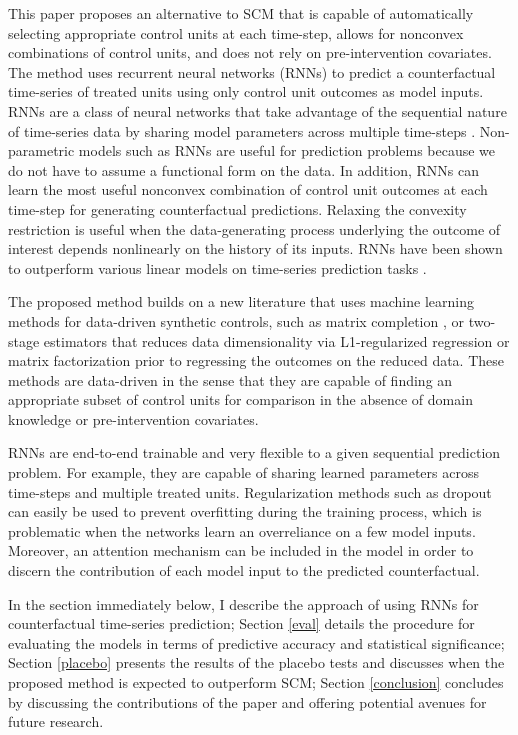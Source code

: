\documentclass[hidelinks,12pt]{article}
\begin{document}
This paper proposes an alternative to SCM that is capable of automatically selecting appropriate control units at each time-step, allows for nonconvex combinations of control units, and does not rely on pre-intervention covariates. The method uses recurrent neural networks (RNNs) to predict a counterfactual time-series of treated units using only control unit outcomes as model inputs. RNNs are a class of neural networks that take advantage of the sequential nature of time-series data by sharing model parameters across multiple time-steps \citep{el1995}. Non-parametric models such as RNNs are useful for prediction problems because we do not have to assume a functional form on the data. In addition, RNNs can learn the most useful nonconvex combination of control unit outcomes at each time-step for generating counterfactual predictions. Relaxing the convexity restriction is useful when the data-generating process underlying the outcome of interest depends nonlinearly on the history of its inputs. RNNs have been shown to outperform various linear models on time-series prediction tasks \citep{cinar2017position}. 

The proposed method builds on a new literature that uses machine learning methods for data-driven synthetic controls, such as matrix completion \citep{athey2017matrix,2019arXiv190308028P}, or two-stage estimators that reduces data dimensionality via L1-regularized regression \citep{doudchenko2016balancing,carvalho2018arco} or matrix factorization \citep{amjad2018robust} prior to regressing the outcomes on the reduced data. These methods are data-driven in the sense that they are capable of finding an appropriate subset of control units for comparison in the absence of domain knowledge or pre-intervention covariates. 

RNNs are end-to-end trainable and very flexible to a given sequential prediction problem. For example, they are capable of sharing learned parameters across time-steps and multiple treated units. Regularization methods such as dropout can easily be used to prevent overfitting during the training process, which is problematic when the networks learn an overreliance on a few model inputs. Moreover, an attention mechanism can be included in the model in order to discern the contribution of each model input to the predicted counterfactual. 

In the section immediately below, I describe the approach of using RNNs for counterfactual time-series prediction; Section \ref{eval} details the procedure for evaluating the models in terms of predictive accuracy and statistical significance; Section \ref{placebo} presents the results of the placebo tests and discusses when the proposed method is expected to outperform SCM; Section \ref{conclusion} concludes by discussing the contributions of the paper and offering potential avenues for future research. 
\end{document}
